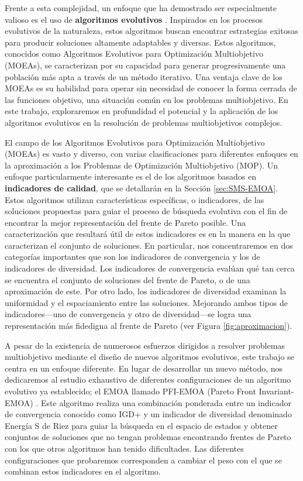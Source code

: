 Frente a esta complejidad, un enfoque que ha demostrado ser especialmente valioso es el uso de \textbf{algoritmos evolutivos} \cite{coelloEvolutionaryAlgorithmsSolving}. Inspirados en los procesos evolutivos de la naturaleza, estos algoritmos buscan encontrar estrategias exitosas para producir soluciones altamente adaptables y diversas. Estos algoritmos, conocidos como Algoritmos Evolutivos para Optimización Multiobjetivo (MOEAs), se caracterizan por su capacidad para generar progresivamente una población más apta a través de un método iterativo. Una ventaja clave de los MOEAs es su habilidad para operar sin necesidad de conocer la forma cerrada de las funciones objetivo, una situación común en los problemas multiobjetivo. En este trabajo, exploraremos en profundidad el potencial y la aplicación de los algoritmos evolutivos en la resolución de problemas multiobjetivos complejos.

El campo de los Algoritmos Evolutivos para Optimización Multiobjetivo (MOEAs) es vasto y diverso, con varias clasificaciones para diferentes enfoques en la aproximación a los Problemas de Optimización Multiobjetivo (MOP). Un enfoque particularmente interesante es el de los algoritmos basados en \textbf{indicadores de calidad}, que se detallarán en la Sección \ref{sec:SMS-EMOA}. Estos algoritmos utilizan características específicas, o indicadores, de las soluciones propuestas para guiar el proceso de búsqueda evolutiva con el fin de encontrar la mejor representación del frente de Pareto posible. Una caracterización que resultará útil de estos indicadores es en la manera en la que caracterizan el conjunto de soluciones. En particular, nos concentraremos en dos categorías importantes que son los indicadores de convergencia y los de indicadores de diversidad. Los indicadores de convergencia evalúan qué tan cerca se encuentra el conjunto de soluciones del frente de Pareto, o de una aproximación de este. Por otro lado, los indicadores de diversidad examinan la uniformidad y el espaciamiento entre las soluciones. Mejorando ambos tipos de indicadores—uno de convergencia y otro de diversidad—se logra una representación más fidedigna al frente de Pareto (ver Figura \ref{fig:aproximacion}).

A pesar de la existencia de numerosos esfuerzos dirigidos a resolver problemas multiobjetivo mediante el diseño de nuevos algoritmos evolutivos, este trabajo se centra en un enfoque diferente. En lugar de desarrollar un nuevo método, nos dedicaremos al estudio exhaustivo de diferentes configuraciones de un algoritmo evolutivo ya establecido; el EMOA llamado PFI-EMOA (Pareto Front Invariant-EMOA) \cite{PFI}. Este algoritmo realiza una combinación ponderada entre un indicador de convergencia conocido como IGD+ \cite{IGD} y un indicador de diversidad denominado Energía S de Riez \cite{sEnergy} para guiar la búsqueda en el espacio de estados y obtener conjuntos de soluciones que no tengan problemas encontrando frentes de Pareto con los que otros algoritmos han tenido dificultades. Las diferentes configuraciones que probaremos corresponden a cambiar el peso con el que se combinan estos indicadores en el algoritmo. 
    
